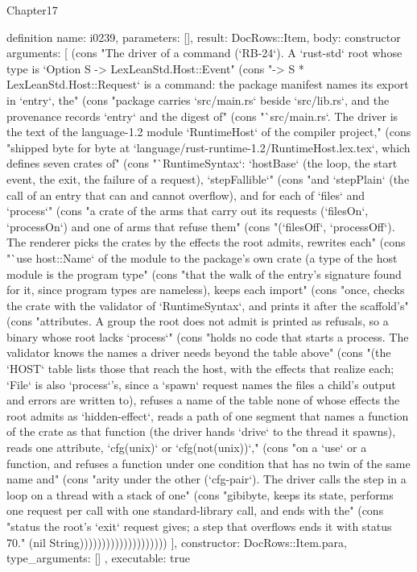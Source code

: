 \begin{lexlean}{Chapter17}
\begin{semanticmodule}
definition{
  name: i0239,
  parameters: [],
  result: DocRows::Item,
  body: constructor{
    arguments: [
      (cons "The driver of a command (`RB-24`). A `rust-std` root whose type is `Option S -> LexLeanStd.Host::Event" (cons "-> S * LexLeanStd.Host::Request` is a command: the package manifest names its export in `entry`, the" (cons "package carries `src/main.rs` beside `src/lib.rs`, and the provenance records `entry` and the digest of" (cons "`src/main.rs`. The driver is the text of the language-1.2 module `RuntimeHost` of the compiler project," (cons "shipped byte for byte at `language/rust-runtime-1.2/RuntimeHost.lex.tex`, which defines seven crates of" (cons "`RuntimeSyntax`: `hostBase` (the loop, the start event, the exit, the failure of a request), `stepFallible`" (cons "and `stepPlain` (the call of an entry that can and cannot overflow), and for each of `files` and `process`" (cons "a crate of the arms that carry out its requests (`filesOn`, `processOn`) and one of arms that refuse them" (cons "(`filesOff`, `processOff`). The renderer picks the crates by the effects the root admits, rewrites each" (cons "`use host::Name` of the module to the package's own crate (a type of the host module is the program type" (cons "that the walk of the entry's signature found for it, since program types are nameless), keeps each import" (cons "once, checks the crate with the validator of `RuntimeSyntax`, and prints it after the scaffold's" (cons "attributes. A group the root does not admit is printed as refusals, so a binary whose root lacks `process`" (cons "holds no code that starts a process. The validator knows the names a driver needs beyond the table above" (cons "(the `HOST` table lists those that reach the host, with the effects that realize each; `File` is also `process`'s, since a `spawn` request names the files a child's output and errors are written to), refuses a name of the table none of whose effects the root admits as `hidden-effect`, reads a path of one segment that names a function of the crate as that function (the driver hands `drive` to the thread it spawns), reads one attribute, `cfg(unix)` or `cfg(not(unix))`," (cons "on a `use` or a function, and refuses a function under one condition that has no twin of the same name and" (cons "arity under the other (`cfg-pair`). The driver calls the step in a loop on a thread with a stack of one" (cons "gibibyte, keeps its state, performs one request per call with one standard-library call, and ends with the" (cons "status the root's `exit` request gives; a step that overflows ends it with status 70." (nil String))))))))))))))))))))
    ],
    constructor: DocRows::Item.para,
    type_arguments: []
  },
  executable: true
}


\end{semanticmodule}
\end{lexlean}
